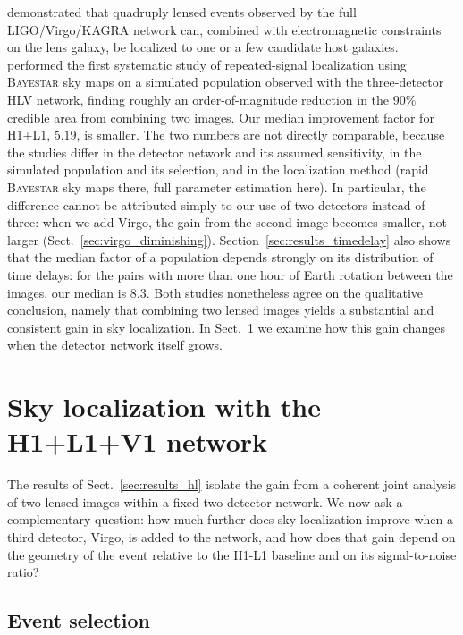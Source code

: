 \documentclass{aa}
\begin{document}
\citet{hubble_constant_lensing} demonstrated that quadruply lensed events
observed by the full LIGO/Virgo/KAGRA network can, combined with
electromagnetic constraints on the lens galaxy, be localized to one or a few
candidate host galaxies. \citet{Hannuksela_skyloc} performed the first
systematic study of repeated-signal localization using
\textsc{Bayestar} \citep{SingerPrice2016} sky maps on a simulated population observed with the
three-detector HLV network, finding roughly an order-of-magnitude reduction
in the 90\% credible area from combining two images. Our median improvement
factor for H1+L1, $5.19$, is smaller. The two numbers are not directly
comparable, because the studies differ in the detector network and its
assumed sensitivity, in the simulated population and its selection, and in
the localization method (rapid \textsc{Bayestar} sky maps there, full
parameter estimation here). In particular, the difference cannot be
attributed simply to our use of two detectors instead of three: when we add
Virgo, the gain from the second image becomes smaller, not larger
(Sect.~\ref{sec:virgo_diminishing}). Section~\ref{sec:results_timedelay}
also shows that the median factor of a population depends strongly on its
distribution of time delays: for the pairs with more than one hour of Earth
rotation between the images, our median is $8.3$. Both studies nonetheless
agree on the qualitative conclusion, namely that combining two lensed images
yields a substantial and consistent gain in sky localization. In
Sect.~\ref{sec:virgo} we examine how this gain changes when the detector
network itself grows.

\section{Sky localization with the H1+L1+V1 network}
\label{sec:virgo}

The results of Sect.~\ref{sec:results_hl} isolate the gain from a coherent joint
analysis of two lensed images within a fixed two-detector network. We now ask a complementary question: how much further does sky localization improve when a third detector, Virgo, is added to the network, and how does that gain depend on the geometry of the event relative to the H1-L1 baseline and on its signal-to-noise ratio?

\subsection{Event selection}
\label{sec:virgo_subsample}
\end{document}
